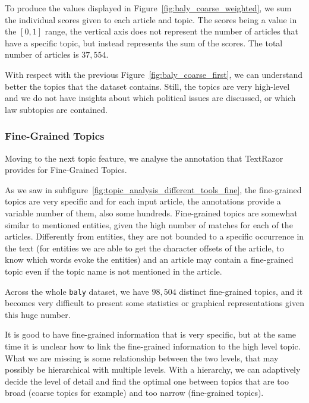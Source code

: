 To produce the values displayed in Figure~\ref{fig:baly_coarse_weighted}, we sum the individual scores given to each article and topic. The scores being a value in the $[0,1]$ range, the vertical axis does not represent the number of articles that have a specific topic, but instead represents the sum of the scores. The total number of articles is $37,554$.


With respect with the previous Figure~\ref{fig:baly_coarse_first}, we can understand better the topics that the dataset contains.
Still, the topics are very high-level and we do not have insights about which political issues are discussed, or which law subtopics are contained.



\subsubsection{\statusorange Fine-Grained Topics}

Moving to the next topic feature, we analyse the annotation that TextRazor provides for Fine-Grained Topics.

As we saw in subfigure~\ref{fig:topic_analysis_different_tools_fine}, the fine-grained topics are very specific and for each input article, the annotations provide a variable number of them, also some hundreds.
Fine-grained topics are somewhat similar to mentioned entities, given the high number of matches for each of the articles. Differently from entities, they are not bounded to a specific occurrence in the text (for entities we are able to get the character offsets of the article, to know which words evoke the entities) and an article may contain a fine-grained topic even if the topic name is not  mentioned in the article.

Across the whole \texttt{baly} dataset, we have $98,504$ distinct fine-grained topics, and it becomes very difficult to present some statistics or graphical representations given this huge number.

It is good to have fine-grained information that is very specific, but at the same time it is unclear how to link the fine-grained information to the high level topic. What we are missing is some relationship between the two levels, that may possibly be hierarchical with multiple levels.
With a hierarchy, we can adaptively decide the level of detail and find the optimal one between topics that are too broad (coarse topics for example) and too narrow (fine-grained topics).

